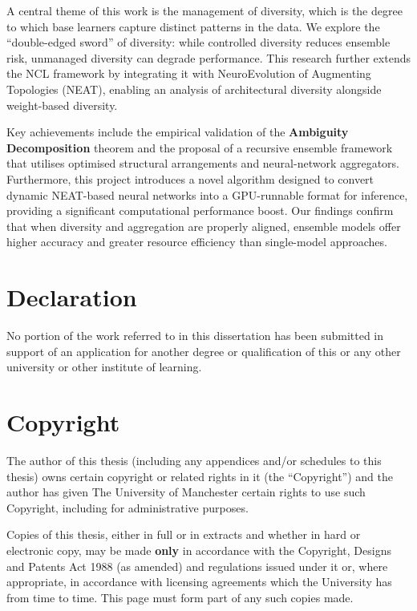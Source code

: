 \documentclass[draft]{article}
\begin{document}
A central theme of this work is the management of diversity, which is the degree to which base learners capture distinct patterns in the data. We explore the ``double-edged sword'' of diversity: while controlled diversity reduces ensemble risk, unmanaged diversity can degrade performance. This research further extends the NCL framework by integrating it with NeuroEvolution of Augmenting Topologies (NEAT), enabling an analysis of architectural diversity alongside weight-based diversity. 

Key achievements include the empirical validation of the \textbf{Ambiguity Decomposition} theorem and the proposal of a recursive ensemble framework that utilises optimised structural arrangements and neural-network aggregators. Furthermore, this project introduces a novel algorithm designed to convert dynamic NEAT-based neural networks into a GPU-runnable format for inference, providing a significant computational performance boost. Our findings confirm that when diversity and aggregation are properly aligned, ensemble models offer higher accuracy and greater resource efficiency than single-model approaches. 


\newpage
\section*{Declaration}
No portion of the work referred to in this dissertation has
been submitted in support of an application for another
degree or qualification of this or any other university or
other institute of learning. 


\section*{Copyright}
The author of this thesis (including any appendices and/or schedules to this thesis) owns certain copyright or related rights in it (the ``Copyright'') and the author has given The University of Manchester certain rights to use such Copyright, including for administrative purposes. 

Copies of this thesis, either in full or in extracts and whether in hard or electronic copy, may be made \textbf{only} in accordance with the Copyright, Designs and Patents Act 1988 (as amended) and regulations issued under it or, where appropriate, in accordance with licensing agreements which the University has from time to time. This page must form part of any such copies made. 
\end{document}
